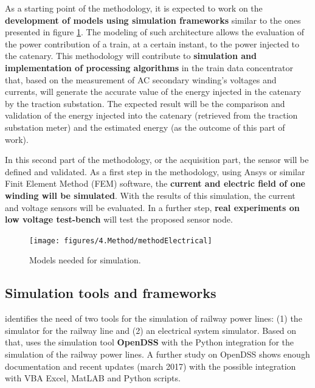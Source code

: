 As a starting point of the methodology, it is expected to work on the \textbf{development of models using simulation frameworks} similar to the ones presented in figure \ref{fig:4.methodElectrical}. The modeling of such architecture allows the evaluation of the power contribution of a train, at a certain instant, to the power injected to the catenary. This methodology will contribute to \textbf{simulation and implementation of processing algorithms} in the train data concentrator that, based on the measurement of AC secondary winding's voltages and currents, will generate the accurate value of the energy injected in the catenary by the traction substation. The expected result will be the comparison and validation of the energy injected into the catenary (retrieved from the traction substation meter) and the estimated energy (as the outcome of this part of work).

In this second part of the methodology, or the acquisition part, the sensor will be defined and validated. As a first step in the methodology, using Ansys or similar Finit Element Method (FEM) software, the \textbf{current and electric field of one winding will be simulated}. With the results of this simulation, the current and voltage sensors will be evaluated. In a further step, \textbf{real experiments on low voltage test-bench} will test the proposed sensor node.



\begin{figure}[h!]
	\centering
	\texttt{[image: figures/4.Method/methodElectrical]}
	\caption{Models needed for simulation.}
	\label{fig:4.methodElectrical}
\end{figure}



\subsection{Simulation tools and frameworks}

\cite{pilo2000} identifies the need of two tools for the simulation of railway power lines: (1) the simulator for the railway line and (2) an electrical system simulator. Based on that, \cite{almagro2017} uses the simulation tool \textbf{OpenDSS} with the Python integration for the simulation of the railway power lines. A further study on OpenDSS shows enough documentation and recent updates (march 2017) with the possible integration with VBA Excel, MatLAB and Python scripts.

